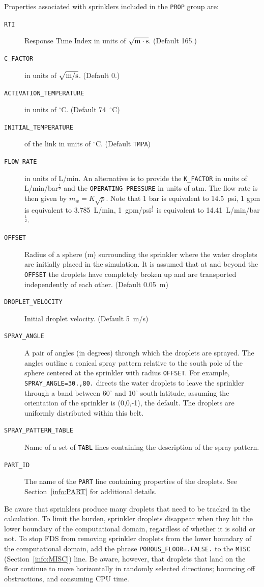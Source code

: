 \documentclass[11pt]{book}
\newcommand{\ct}{\tt\small}
\newcommand{\dm}{\dot{m}}
\newcommand{\ha}{\frac{1}{2}}
\begin{document}
Properties associated with sprinklers included in the {\ct PROP} group are:
\begin{description}
\item[{\ct RTI}] Response Time Index in units of $\sqrt{\hbox{m}\cdot \hbox{s}}$. (Default 165.)
\item[{\ct C\_FACTOR}] in units of $\sqrt{\hbox{m/s}}$. (Default 0.)
\item[{\ct ACTIVATION\_TEMPERATURE}] in units of $^\circ$C. (Default 74~$^\circ$C)
\item[{\ct INITIAL\_TEMPERATURE}] of the link in units of $^\circ$C. (Default {\ct TMPA})
\item[{\ct FLOW\_RATE}] in units of L/min.
An alternative is to provide the {\ct K\_FACTOR} in units of L/min/bar$^\ha$ and the
{\ct OPERATING\_PRESSURE} in units of atm.
The flow rate is then given by $ \dm_w = K \sqrt{p}$. Note that 1 bar is equivalent to
14.5~psi, 1 gpm is equivalent to 3.785~L/min, 1~gpm/psi$^\ha$ is
equivalent to 14.41~L/min/bar$^\ha$.
\item[{\ct OFFSET}] Radius of a sphere (m) surrounding the
sprinkler where the water droplets are initially placed in the simulation. It is assumed that
at and beyond the {\ct OFFSET} the droplets have completely broken
up and are transported independently of each other. (Default 0.05~m)
\item[{\ct DROPLET\_VELOCITY}]  Initial droplet velocity. (Default 5~m/s)
\item[{\ct SPRAY\_ANGLE}] A pair of angles (in degrees) through which the droplets are sprayed.
The angles outline a conical spray pattern relative to the
south pole of the sphere centered at the sprinkler with radius {\ct OFFSET}.
For example, {\ct SPRAY\_ANGLE=30.,80.} directs the water droplets to leave
the sprinkler through a band between 60$^\circ$ and 10$^\circ$ south latitude, assuming the orientation of
the sprinkler is (0,0,-1), the default. The droplets are uniformly
distributed within this belt.
\item[{\ct SPRAY\_PATTERN\_TABLE}] Name of a set of {\ct TABL} lines containing the description of the spray pattern.
\item[{\ct PART\_ID}] The name of the {\ct PART} line containing properties of the droplets.
See Section~\ref{info:PART} for additional details.
\end{description}

\noindent
Be aware that sprinklers produce many droplets that need to be
tracked in the calculation. To limit the burden, sprinkler droplets disappear when they hit the
lower boundary of the computational domain, regardless of whether it is solid
or not. To stop FDS from removing sprinkler droplets from the lower boundary of the computational domain,
add the phrase {\ct POROUS\_FLOOR=.FALSE.} to the {\ct MISC} (Section~\ref{info:MISC}) line. Be aware, however, that
droplets that land on the floor continue to move horizontally in randomly selected
directions; bouncing off obstructions, and consuming CPU time.
\end{document}
